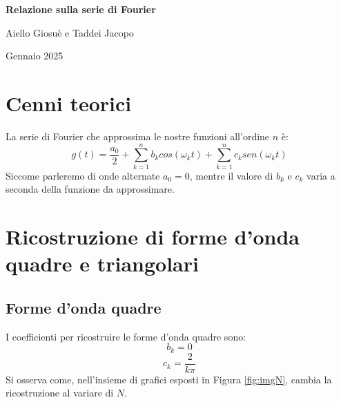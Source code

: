 \documentclass[10pt,a4paper]{article}
\begin{document}
\begin{titlepage}
    \centering
    \vspace*{1cm}
    {\huge\bfseries Relazione sulla serie di Fourier\par}
    \vspace{0.5cm}
    {\Large Aiello Giosuè e Taddei Jacopo\par}
    \vspace{0.5cm}
    {\large Gennaio 2025\par}
    \vfill
\end{titlepage}

\section{Cenni teorici}
La serie di Fourier che approssima le nostre funzioni all'ordine $n$ è:
\begin{equation}
\label{eq1}
    g(t) = \frac{a_0}{2} + \sum_{k=1}^ {n}b_k cos(\omega_k t) + \sum_{k=1}^ {n}c_k sen(\omega_k t)
\end{equation}
Siccome parleremo di onde alternate $a_0=0$, mentre il valore di $b_k$ e $c_k$ varia a seconda della funzione da approssimare. 

\section{Ricostruzione di forme d'onda quadre e triangolari}

\subsection{Forme d'onda quadre}

I coefficienti per ricostruire le forme d'onda quadre sono:
\begin{equation}
\label{eq2}
    b_k=0
\end{equation}
\begin{equation}
\label{eq3}
    c_k=\frac{2}{k\pi}
\end{equation}
Si osserva come, nell'insieme di grafici esposti in Figura \ref{fig:imgN}, cambia la ricostruzione al variare di $N$.
\end{document}
